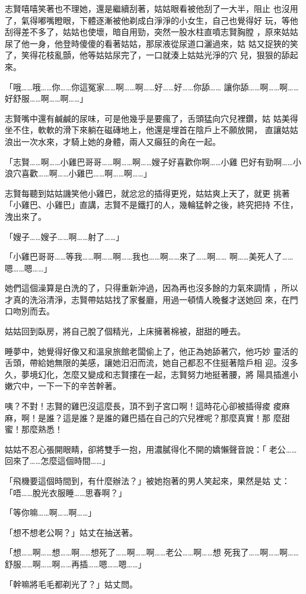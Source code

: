 志賢嘻嘻笑著也不理她，還是繼續刮著，姑姑眼看被他刮了一大半，阻止
也沒用了，氣得嘟嘴瞪眼，下體逐漸被他剃成白淨淨的小女生，自己也覺得好
玩，等他刮得差不多了，姑姑也使壞，暗自用勁，突然一股水柱直噴志賢胸膛
，原來姑姑尿了他一身，他登時傻傻的看著姑姑，那尿液從尿道口灑過來，姑
姑又捉狹的笑了，笑得花枝亂顫，他等姑姑尿完了，一口就湊上姑姑光淨的穴
兒，狠狠的舔起來。

「哦……哦……你……你這冤家……啊……啊……好……好……你舔……
讓你舔……啊……啊……好舒服……啊……啊……」

志賢嘴中還有鹹鹹的尿味，可是他幾乎是要瘋了，舌頭猛向穴兒裡鑽，姑
姑美得坐不住，軟軟的滑下來躺在磁磚地上，他還是埋首在陰戶上不願放開，
直讓姑姑浪出一次水來，才騎上她的身體，兩人又癲狂的肏在一起。

「志賢……啊……小雞巴哥哥……啊……啊……嫂子好喜歡你啊……小雞
巴好有勁啊……小浪穴喜歡……啊……小雞巴……啊……啊……」

志賢每聽到姑姑譏笑他小雞巴，就忿忿的插得更兇，姑姑爽上天了，就更
挑著「小雞巴、小雞巴」直講，志賢不是鐵打的人，幾輪猛幹之後，終究把持
不住，洩出來了。

「嫂子……嫂子……啊……射了……」

「小雞巴哥哥……等我……啊……啊……我也……啊……來了……啊……
啊……美死人了……嗯……嗯……」

她們這個澡算是白洗的了，只得重新沖過，因為再也沒多餘的力氣來調情
，所以才真的洗浴清淨，志賢帶姑姑找了家餐廳，用過一頓情人晚餐才送她回
來，在門口吻別而去。

姑姑回到臥房，將自己脫了個精光，上床擁著棉被，甜甜的睡去。

睡夢中，她覺得好像又和溫泉旅館老闆偷上了，他正為她舔著穴，他巧妙
靈活的舌頭，帶給她無限的美感，讓她汨汨而流，她自己都忍不住挺著陰戶相
迎。沒多久，夢境幻化，怎麼又變成和志賢摟在一起，志賢努力地挺著腰，將
陽具插進小嫩穴中，一下一下的辛苦幹著。

咦？不對！志賢的雞巴沒這麼長，頂不到子宮口啊！這時花心卻被插得痠
痠麻麻，啊！是誰？這是誰？是誰的雞巴插在自己的穴兒裡呢？那麼真實！那
麼甜蜜！那麼熟悉！

姑姑不忍心張開眼睛，卻將雙手一抱，用濃膩得化不開的嬌懶聲音說：「
老公……回來了……怎麼這個時間……」

「飛機要這個時間到，有什麼辦法？」被她抱著的男人笑起來，果然是姑
丈：「唔……脫光衣服睡……思春啊？」

「等你嘛……啊……啊……」

「想不想老公啊？」姑丈在抽送著。

「想……啊……想……啊……想死了……啊……啊……老公……啊……想
死我了……啊……啊……舒服……啊……啊……再插……嗯……嗯……」

「幹嘛將毛毛都剃光了？」姑丈問。

